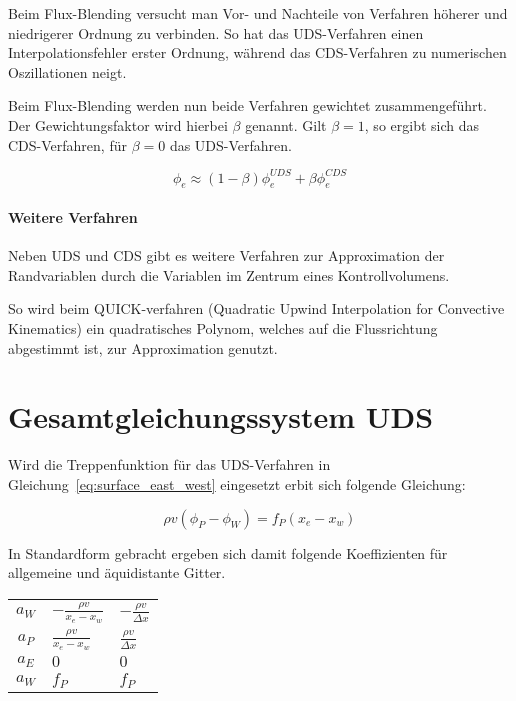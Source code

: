 \documentclass[11pt, ngerman,colorback,accentcolor=tud2d]{tudreport}
\begin{document}
Beim Flux-Blending versucht man Vor- und Nachteile von Verfahren höherer und niedrigerer
Ordnung zu verbinden. So hat das UDS-Verfahren einen Interpolationsfehler erster Ordnung,
während das CDS-Verfahren zu numerischen Oszillationen neigt.

Beim Flux-Blending werden nun beide Verfahren gewichtet zusammengeführt. Der Gewichtungsfaktor
wird hierbei $\beta$ genannt. Gilt $\beta = 1$, so ergibt sich das CDS-Verfahren, für
$\beta = 0$ das UDS-Verfahren.

\begin{equation}
  \phi_e \approx (1-\beta)\phi_e^{UDS} + \beta \phi_e^{CDS}
  \label{eq:flux_blending}
\end{equation}



\paragraph{Weitere Verfahren}
Neben UDS und CDS gibt es weitere Verfahren zur Approximation der Randvariablen durch
die Variablen im Zentrum eines Kontrollvolumens.

So wird beim QUICK-verfahren (Quadratic Upwind Interpolation for Convective
Kinematics) ein quadratisches Polynom, welches auf die Flussrichtung abgestimmt ist,
zur Approximation genutzt.

\section{Gesamtgleichungssystem UDS}

Wird die Treppenfunktion für das UDS-Verfahren in Gleichung~\eqref{eq:surface_east_west}
eingesetzt erbit sich folgende Gleichung:

\begin{equation}
  \rho v (\phi_P - \phi_W) = f_P(x_e-x_w)
\end{equation}

In Standardform gebracht ergeben sich damit folgende Koeffizienten für allgemeine
und äquidistante Gitter.

\begin{tabular}{cll}
  $a_W$ & $-\frac{\rho v}{x_e-x_w}$ & $-\frac{\rho v}{\Delta x}$ \\
  $a_P$ & $\frac{\rho v}{x_e-x_w}$ & $\frac{\rho v}{\Delta x}$ \\
  $a_E$ & $0$ & $0$ \\
  $a_W$ & $f_P$ & $f_P$ \\
\end{tabular}
\end{document}
